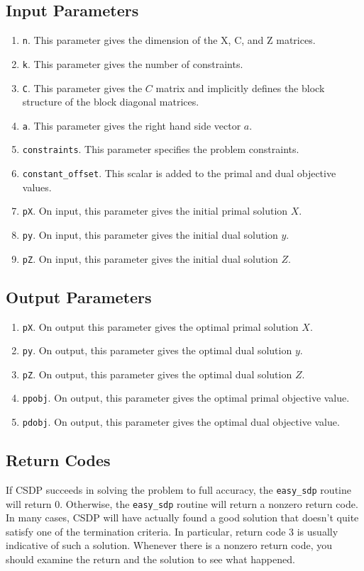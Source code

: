 \documentclass{article}
\begin{document}
\subsection*{Input Parameters}
\begin{enumerate}
\item {\tt n}. This parameter gives the dimension of the X, C, and Z matrices.
\item {\tt k}. This parameter gives the number of constraints.
\item {\tt C}.  This parameter gives the $C$ matrix and implicitly defines 
the block structure of the block diagonal matrices.
\item {\tt a}.  This parameter gives the right hand side vector $a$.
\item {\tt constraints}.  This parameter specifies the problem constraints.
\item {\tt constant\_offset}.  This scalar is added to the primal and dual 
objective values.  
\item {\tt pX}.  On input, this parameter gives the initial primal solution $X$.
\item {\tt py}.  On input, this parameter gives the initial dual solution $y$.
\item {\tt pZ}.  On input, this parameter gives the initial dual solution $Z$.
\end{enumerate}
\subsection*{Output Parameters}
\begin{enumerate}
\item {\tt pX}.  On output this parameter gives the optimal primal solution $X$. 
\item {\tt py}.  On output, this parameter gives the optimal dual solution $y$.
\item {\tt pZ}.  On output, this parameter gives the optimal dual solution $Z$.
\item {\tt ppobj}.  On output, this parameter gives the optimal primal objective value.
\item {\tt pdobj}.  On output, this parameter gives the optimal dual objective value.
\end{enumerate}
\subsection*{Return Codes}
If CSDP succeeds in solving the problem to full accuracy, 
the {\tt easy\_sdp} routine will return 0.  
Otherwise, the {\tt easy\_sdp} routine will return a nonzero
return code.  In many cases, CSDP will have actually found a good 
solution that doesn't quite satisfy one of the termination criteria.
In particular, return code 3 is usually indicative of such a solution.
Whenever there is a nonzero return code, you should examine the return 
and the solution to see what happened.  
    
\end{document}
